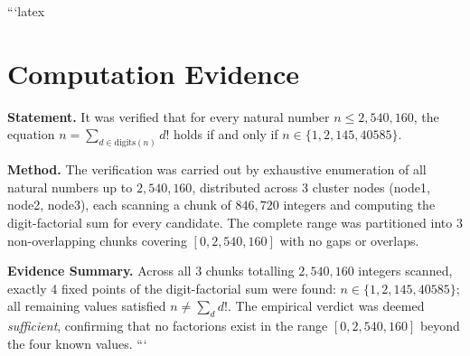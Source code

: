 ```latex
\section*{Computation Evidence}

\textbf{Statement.} It was verified that for every natural number $n \leq 2{,}540{,}160$, the equation $n = \sum_{d \in \text{digits}(n)} d!$ holds if and only if $n \in \{1, 2, 145, 40585\}$.

\textbf{Method.} The verification was carried out by exhaustive enumeration of all natural numbers up to $2{,}540{,}160$, distributed across 3 cluster nodes (node1, node2, node3), each scanning a chunk of $846{,}720$ integers and computing the digit-factorial sum for every candidate. The complete range was partitioned into 3 non-overlapping chunks covering $[0, 2{,}540{,}160]$ with no gaps or overlaps.

\textbf{Evidence Summary.} Across all 3 chunks totalling $2{,}540{,}160$ integers scanned, exactly 4 fixed points of the digit-factorial sum were found: $n \in \{1, 2, 145, 40585\}$; all remaining values satisfied $n \neq \sum_{d} d!$. The empirical verdict was deemed \emph{sufficient}, confirming that no factorions exist in the range $[0, 2{,}540{,}160]$ beyond the four known values.
```
